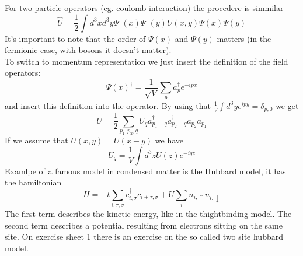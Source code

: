 \documentclass{report}
\begin{document}
For two particle operators (eg. coulomb interaction) the procedere is simmilar \[
	\hat{U} = \frac{1}{2} \int d^3x d^3y \Psi^\dagger(x) \Psi^\dagger(y) U(x, y) \Psi(x) \Psi(y)
\] It's important to note that the order of $\Psi(x)$ and $\Psi(y)$ matters (in the fermionic case, with bosons it doesn't matter). \\
To switch to momentum representation we just insert the definition of the field operators: \[
	\Psi(x)^\dagger = \frac{1}{\sqrt{V} } \sum_{p} a_p^\dagger e^{-i p x}
\] and insert this definition into the operator. By using that $\frac{1}{V} \int d^3y e^{ipy} = \delta_{p,0}$ we get \[
U = \frac{1}{2} \sum_{p_1,p_2,q} U_q a_{p_1+q}^\dagger a_{p_2-q}^\dagger a_{p_2} a_{p_1}
\] If we assume that $U(x,y) = U(x - y)$ we have  \[
U_q = \frac{1}{V} \int d^3z U(z) e^{-iqz}
\]
Examlpe of a famous model in condensed matter is the Hubbard model, it has the hamiltonian \[
	H = -t \sum_{i, \tau, \sigma} c_{i, \sigma}^\dagger c_{i+\tau, \sigma} + U \sum_{i} n_{i,\uparrow}n_{i, \downarrow}
\] The first term describes the kinetic energy, like in the thightbinding model. The second term describes a potential resulting from electrons sitting on the same site. On exercise sheet 1 there is an exercise on the so called two site hubbard model. \\
\end{document}
